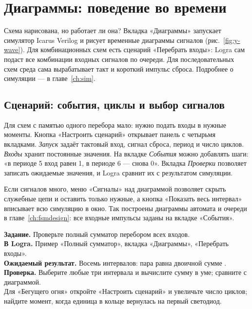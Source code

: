\section{Диаграммы: поведение во времени}

Схема нарисована, но работает ли она? Вкладка «Диаграммы» запускает
симулятор Icarus Verilog и рисует временные диаграммы сигналов
(рис.~\ref{fig:y-wave}). Для комбинационных схем есть сценарий «Перебрать
входы»: Logra сам подаст все комбинации входных сигналов по очереди. Для
последовательных схем среда сама вырабатывает такт и короткий импульс сброса.
Подробнее о симуляции --- в главе~\ref{ch:sim}.


\subsection{Сценарий: события, циклы и выбор сигналов}

Для схем с памятью одного перебора мало: нужно подать входы в нужные
моменты. Кнопка «Настроить сценарий» открывает панель с четырьмя вкладками.
\emph{Запуск} задаёт тактовый вход, сигнал сброса, период и число циклов.
\emph{Входы} хранит постоянные значения. На вкладке \emph{События} можно
добавлять шаги: «в периоде 5 вход  равен 1, в периоде 6 --- снова 0».
Вкладка \emph{Проверки} позволяет записать ожидаемые значения, и Logra
сравнит их с результатом симуляции.

Если сигналов много, меню «Сигналы» над диаграммой позволяет скрыть
служебные цепи и оставить только нужные, а кнопка «Показать весь интервал»
вписывает всю симуляцию в окно. Так построены диаграммы автомата и очереди
в главе~\ref{ch:fsmdesign}: все входные импульсы заданы на вкладке «События».

\begin{diybox}
\textbf{Задание.} Проверьте полный сумматор перебором всех входов.\\
\textbf{В Logra.} Пример «Полный сумматор», вкладка «Диаграммы», «Перебрать
входы».\\
\textbf{Ожидаемый результат.} Восемь интервалов: пара  равна
двоичной сумме .\\
\textbf{Проверка.} Выберите любые три интервала и вычислите сумму в уме;
сравните с диаграммой.\\
 Для «Бегущего огня» откройте «Настроить сценарий» и увеличьте
число циклов; найдите момент, когда единица в кольце вернулась на первый
светодиод.
\end{diybox}

